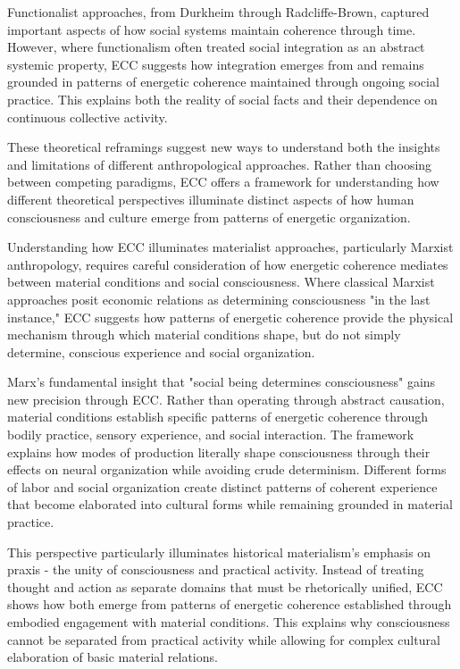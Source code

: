 \begin{refsection}
Functionalist approaches, from Durkheim through Radcliffe-Brown, captured important aspects of how social systems maintain coherence through time. However, where functionalism often treated social integration as an abstract systemic property, ECC suggests how integration emerges from and remains grounded in patterns of energetic coherence maintained through ongoing social practice. This explains both the reality of social facts and their dependence on continuous collective activity.

These theoretical reframings suggest new ways to understand both the insights and limitations of different anthropological approaches. Rather than choosing between competing paradigms, ECC offers a framework for understanding how different theoretical perspectives illuminate distinct aspects of how human consciousness and culture emerge from patterns of energetic organization.

Understanding how ECC illuminates materialist approaches, particularly Marxist anthropology, requires careful consideration of how energetic coherence mediates between material conditions and social consciousness. Where classical Marxist approaches posit economic relations as determining consciousness "in the last instance," ECC suggests how patterns of energetic coherence provide the physical mechanism through which material conditions shape, but do not simply determine, conscious experience and social organization.

Marx's fundamental insight that "social being determines consciousness" gains new precision through ECC. Rather than operating through abstract causation, material conditions establish specific patterns of energetic coherence through bodily practice, sensory experience, and social interaction. The framework explains how modes of production literally shape consciousness through their effects on neural organization while avoiding crude determinism. Different forms of labor and social organization create distinct patterns of coherent experience that become elaborated into cultural forms while remaining grounded in material practice.

This perspective particularly illuminates historical materialism's emphasis on praxis - the unity of consciousness and practical activity. Instead of treating thought and action as separate domains that must be rhetorically unified, ECC shows how both emerge from patterns of energetic coherence established through embodied engagement with material conditions. This explains why consciousness cannot be separated from practical activity while allowing for complex cultural elaboration of basic material relations.


\end{refsection}
